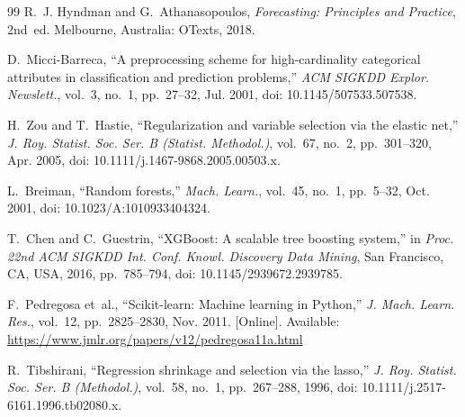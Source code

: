 \documentclass[conference]{IEEEtran}
\begin{document}
\begin{thebibliography}{99}
R.~J. Hyndman and G.~Athanasopoulos, \emph{Forecasting: Principles and Practice}, 2nd~ed. Melbourne, Australia: OTexts, 2018.

D.~Micci-Barreca, ``A preprocessing scheme for high-cardinality categorical attributes in classification and prediction problems,'' \emph{ACM SIGKDD Explor. Newslett.}, vol.~3, no.~1, pp.~27--32, Jul. 2001, doi: 10.1145/507533.507538.

H.~Zou and T.~Hastie, ``Regularization and variable selection via the elastic net,'' \emph{J. Roy. Statist. Soc. Ser. B (Statist. Methodol.)}, vol.~67, no.~2, pp.~301--320, Apr. 2005, doi: 10.1111/j.1467-9868.2005.00503.x.

L.~Breiman, ``Random forests,'' \emph{Mach. Learn.}, vol.~45, no.~1, pp.~5--32, Oct. 2001, doi: 10.1023/A:1010933404324.

T.~Chen and C.~Guestrin, ``XGBoost: A scalable tree boosting system,'' in \emph{Proc. 22nd ACM SIGKDD Int. Conf. Knowl. Discovery Data Mining}, San Francisco, CA, USA, 2016, pp.~785--794, doi: 10.1145/2939672.2939785.

F.~Pedregosa et~al., ``Scikit-learn: Machine learning in Python,'' \emph{J. Mach. Learn. Res.}, vol.~12, pp.~2825--2830, Nov. 2011. [Online]. Available: \url{https://www.jmlr.org/papers/v12/pedregosa11a.html}

R.~Tibshirani, ``Regression shrinkage and selection via the lasso,'' \emph{J. Roy. Statist. Soc. Ser. B (Methodol.)}, vol.~58, no.~1, pp.~267--288, 1996, doi: 10.1111/j.2517-6161.1996.tb02080.x.

\end{thebibliography}
\end{document}

